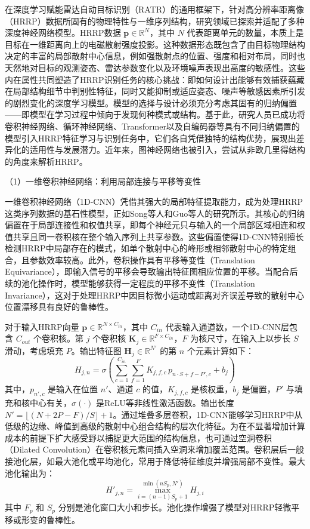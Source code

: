 在深度学习赋能雷达自动目标识别（RATR）的通用框架下，针对高分辨率距离像（HRRP）数据所固有的物理特性与一维序列结构，研究领域已探索并适配了多种深度神经网络模型。HRRP数据 $\mathbf{p} \in \mathbb{R}^N$，其中 $N$ 代表距离单元的数量，本质上是目标在一维距离向上的电磁散射强度投影。这种数据形态既包含了由目标物理结构决定的丰富的局部散射中心信息，例如强散射点的位置、强度和相对布局，同时也天然地对目标的观测姿态、雷达参数变化以及环境噪声表现出高度的敏感性。这些内在属性共同塑造了HRRP识别任务的核心挑战：即如何设计出能够有效捕获蕴藏在局部结构细节中判别性特征，同时又能抑制或适应姿态、噪声等敏感因素所引发的剧烈变化的深度学习模型。模型的选择与设计必须充分考虑其固有的归纳偏置——即模型在学习过程中倾向于发现何种模式或结构。基于此，研究人员已成功将卷积神经网络、循环神经网络、Transformer以及自编码器等具有不同归纳偏置的模型引入HRRP特征学习与识别任务中，它们各自凭借独特的结构优势，展现出差异化的适用性与发展潜力。近年来，图神经网络也被引入，尝试从非欧几里得结构的角度来解析HRRP。

（1）一维卷积神经网络：利用局部连接与平移等变性

一维卷积神经网络（1D-CNN）凭借其强大的局部特征提取能力，成为处理HRRP这类序列数据的基石性模型，正如Song等人和Guo等人的研究所示。其核心的归纳偏置在于局部连接性和权值共享，即每个神经元只与输入的一个局部区域相连和权值共享且同一卷积核在整个输入序列上共享参数。这些偏置使得1D-CNN特别擅长检测HRRP中局部存在的模式，如单个散射中心的峰形或相邻散射中心的特定组合，且参数效率较高。此外，卷积操作具有平移等变性（Translation Equivariance），即输入信号的平移会导致输出特征图相应位置的平移。当配合后续的池化操作时，模型能够获得一定程度的平移不变性（Translation Invariance），这对于处理HRRP中因目标微小运动或距离对齐误差导致的散射中心位置漂移具有良好的鲁棒性。

对于输入HRRP向量 $\mathbf{p} \in \mathbb{R}^{N \times C_{in}}$，其中 $C_{in}$ 代表输入通道数，一个1D-CNN层包含 $C_{out}$ 个卷积核。第 $j$ 个卷积核 $\mathbf{K}_j \in \mathbb{R}^{F \times C_{in}}$，$F$ 为核尺寸，在输入上以步长 $S$ 滑动，考虑填充 $P$。输出特征图 $\mathbf{H}_j \in \mathbb{R}^{N'}$ 的第 $n$ 个元素计算如下：
\begin{equation}
    H_{j,n} = \sigma\left( \sum_{c=1}^{C_{in}} \sum_{f=1}^{F} K_{j,f,c} \, p_{n \cdot S + f - P', c} + b_j \right)
    \label{eq:1d_cnn_conv_detailed_revised}
\end{equation}
其中，$p_{n',c}$ 是输入在位置 $n'$、通道 $c$ 的值，$K_{j,f,c}$ 是核权重，$b_j$ 是偏置，$P'$ 与填充和核中心有关，$\sigma(\cdot)$ 是ReLU等非线性激活函数。输出长度 $N' = \lfloor (N + 2P - F) / S \rfloor + 1$。通过堆叠多层卷积，1D-CNN能够学习HRRP中从低级的边缘、峰值到高级的散射中心组合结构的层次化特征。为在不显著增加计算成本的前提下扩大感受野以捕捉更大范围的结构信息，也可通过空洞卷积（Dilated Convolution）在卷积核元素间插入空洞来增加覆盖范围。卷积层后一般接池化层，如最大池化或平均池化，常用于降低特征维度并增强局部不变性。最大池化输出为：
\begin{equation}
    H'_{j,n} = \max_{i=(n-1)S_p+1}^{\min(nS_p, N')} H_{j,i}
    \label{eq:max_pooling_revised}
\end{equation}
其中 $F_p$ 和 $S_p$ 分别是池化窗口大小和步长。池化操作增强了模型对HRRP轻微平移或形变的鲁棒性。

